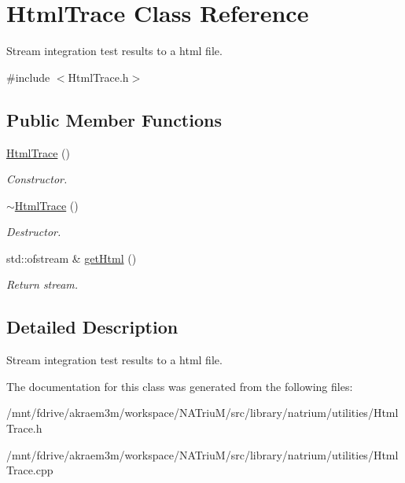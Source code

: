 \hypertarget{classHtmlTrace}{
\section{HtmlTrace Class Reference}
\label{classHtmlTrace}
}


Stream integration test results to a html file.  


{\ttfamily \#include $<$HtmlTrace.h$>$}\subsection*{Public Member Functions}
\begin{DoxyCompactItemize}
\item 
\hypertarget{classHtmlTrace_aad24986d7bce81d050ea6f5ec4773be7}{
\hyperlink{classHtmlTrace_aad24986d7bce81d050ea6f5ec4773be7}{HtmlTrace} ()}
\label{classHtmlTrace_aad24986d7bce81d050ea6f5ec4773be7}

\begin{DoxyCompactList}\small\item\em Constructor. \item\end{DoxyCompactList}\item 
\hypertarget{classHtmlTrace_a27003513f2782cbd57bf387a1fca8be5}{
\hyperlink{classHtmlTrace_a27003513f2782cbd57bf387a1fca8be5}{$\sim$HtmlTrace} ()}
\label{classHtmlTrace_a27003513f2782cbd57bf387a1fca8be5}

\begin{DoxyCompactList}\small\item\em Destructor. \item\end{DoxyCompactList}\item 
\hypertarget{classHtmlTrace_a334a99ca80288f4b25ee6e5d02edf679}{
std::ofstream \& \hyperlink{classHtmlTrace_a334a99ca80288f4b25ee6e5d02edf679}{getHtml} ()}
\label{classHtmlTrace_a334a99ca80288f4b25ee6e5d02edf679}

\begin{DoxyCompactList}\small\item\em Return stream. \item\end{DoxyCompactList}\end{DoxyCompactItemize}


\subsection{Detailed Description}
Stream integration test results to a html file. 

The documentation for this class was generated from the following files:\begin{DoxyCompactItemize}
\item 
/mnt/fdrive/akraem3m/workspace/NATriuM/src/library/natrium/utilities/HtmlTrace.h\item 
/mnt/fdrive/akraem3m/workspace/NATriuM/src/library/natrium/utilities/HtmlTrace.cpp\end{DoxyCompactItemize}
